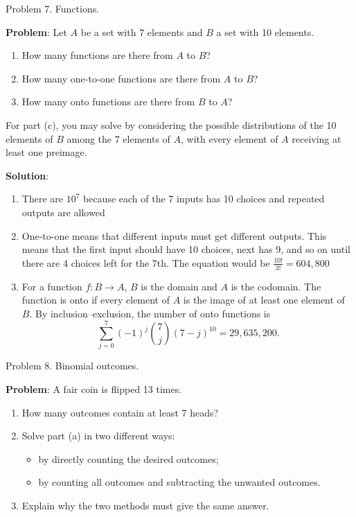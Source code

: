\documentclass{article}
\begin{document}
Problem 7. Functions.

\textbf{Problem}: Let $A$ be a set with 7 elements and $B$ a set with 10 elements.

\begin{enumerate}[label=(\alph*)]
  \item How many functions are there from $A$ to $B$?
  \item How many one-to-one functions are there from $A$ to $B$?
  \item How many onto functions are there from $B$ to $A$?
\end{enumerate}
For part (c), you may solve by considering the possible distributions of the 10 elements of $B$ among the 7 elements of $A$, with every element of $A$ receiving at least one preimage.


\textbf{Solution}: 
\begin{enumerate}[label=(\alph*)]
    \item There are $10^7$ because each of the 7 inputs has 10 choices and repeated outputs are allowed
    \item One-to-one means that different inputs must get different outputs. This means that the first input should have 10 choices, next has 9, and so on until there are 4 choices left for the 7th. The equation would be $\frac{10!}{3!} = 604,800$ 
    \item For a function $f:B\to A$, $B$ is the domain and $A$ is the
codomain. The function is onto if every element of $A$ is the image
of at least one element of $B$. By inclusion--exclusion, the number
of onto functions is
$$
\sum_{j=0}^{7}(-1)^j\binom{7}{j}(7-j)^{10}
=29{,}635{,}200.
$$
\end{enumerate}


Problem 8. Binomial outcomes.

\textbf{Problem}: A fair coin is flipped 13 times.

\begin{enumerate}[label=(\alph*)]
  \item How many outcomes contain at least 7 heads?
  \item Solve part (a) in two different ways:
  \begin{itemize}
    \item by directly counting the desired outcomes;
    \item by counting all outcomes and subtracting the unwanted outcomes.
  \end{itemize}
  \item Explain why the two methods must give the same answer.
\end{enumerate}
\end{document}
